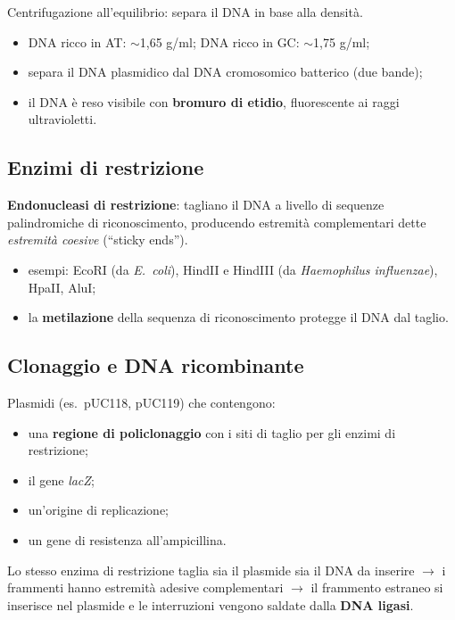 Centrifugazione all'equilibrio: separa il DNA in base alla densità.
\begin{itemize}
  \item DNA ricco in AT: $\sim$1,65 g/ml; DNA ricco in GC: $\sim$1,75 g/ml;
  \item separa il DNA plasmidico dal DNA cromosomico batterico (due bande);
  \item il DNA è reso visibile con \textbf{bromuro di etidio}, fluorescente ai raggi ultravioletti.
\end{itemize}

\subsection{Enzimi di restrizione}

\textbf{Endonucleasi di restrizione}: tagliano il DNA a livello di sequenze palindromiche di riconoscimento, producendo estremità complementari dette \textit{estremità coesive} (``sticky ends'').
\begin{itemize}
  \item esempi: EcoRI (da \textit{E.\ coli}), HindII e HindIII (da \textit{Haemophilus influenzae}), HpaII, AluI;
  \item la \textbf{metilazione} della sequenza di riconoscimento protegge il DNA dal taglio.
\end{itemize}

\subsection{Clonaggio e DNA ricombinante}

Plasmidi (es.\ pUC118, pUC119) che contengono:
\begin{itemize}
  \item una \textbf{regione di policlonaggio} con i siti di taglio per gli enzimi di restrizione;
  \item il gene \textit{lacZ};
  \item un'origine di replicazione;
  \item un gene di resistenza all'ampicillina.
\end{itemize}

Lo stesso enzima di restrizione taglia sia il plasmide sia il DNA da inserire $\rightarrow$ i frammenti hanno estremità adesive complementari $\rightarrow$ il frammento estraneo si inserisce nel plasmide e le interruzioni vengono saldate dalla \textbf{DNA ligasi}.

